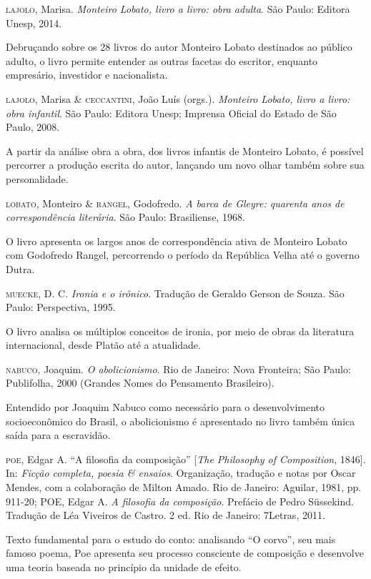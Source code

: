 \documentclass[11pt]{extarticle}
\begin{document}
\textsc{lajolo}, Marisa. \emph{Monteiro Lobato, livro a livro: obra adulta}. São
Paulo: Editora Unesp, 2014.

Debruçando sobre os 28 livros do autor Monteiro Lobato destinados ao público adulto, o livro 
permite entender as outras facetas do escritor, enquanto empresário, investidor e nacionalista.

\textsc{lajolo}, Marisa \& \textsc{ceccantini}, João Luís (orgs.). \emph{Monteiro Lobato,
livro a livro: obra infantil}. São Paulo: Editora Unesp; Imprensa
Oficial do Estado de São Paulo, 2008.

A partir da análise obra a obra, dos livros infantis de Monteiro Lobato, é possível 
percorrer a produção escrita do autor, lançando um novo olhar também sobre sua 
personalidade.

\textsc{lobato}, Monteiro \& \textsc{rangel}, Godofredo. \emph{A barca de Gleyre: quarenta
anos de correspondência literária}. São Paulo: Brasiliense, 1968.

O livro apresenta os largos anos de correspondência ativa de Monteiro Lobato com Godofredo 
Rangel, percorrendo o período da República Velha até o governo Dutra.

\textsc{muecke}, D. C. \emph{Ironia e o irônico}. Tradução de Geraldo Gerson de
Souza. São Paulo: Perspectiva, 1995.

O livro analisa os múltiplos conceitos de ironia, por meio de obras da literatura 
internacional, desde Platão até a atualidade.

\textsc{nabuco}, Joaquim. \emph{O abolicionismo}. Rio de Janeiro: Nova Fronteira;
São Paulo: Publifolha, 2000 (Grandes Nomes do Pensamento Brasileiro).

Entendido por Joaquim Nabuco como necessário para o desenvolvimento socioeconômico 
do Brasil, o abolicionismo é apresentado no livro também única saída para a escravidão.

\textsc{poe}, Edgar A. ``A filosofia da composição'' {[}\emph{The Philosophy of
Composition}, 1846{]}. In: \emph{Ficção completa, poesia \& ensaios}.
Organização, tradução e notas por Oscar Mendes, com a colaboração de
Milton Amado. Rio de Janeiro: Aguilar, 1981, pp. 911-20; POE, Edgar A.
\emph{A filosofia da composição}. Prefácio de Pedro Süssekind. Tradução
de Léa Viveiros de Castro. 2 ed. Rio de Janeiro: 7Letras, 2011. 

Texto fundamental para o estudo do conto: analisando ``O corvo'', seu mais
famoso poema, Poe apresenta seu processo consciente de composição e
desenvolve uma teoria baseada no princípio da unidade de efeito.
\end{document}
